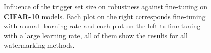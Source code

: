 \begin{figure}
    \caption{Influence of the trigger set size on robustness against fine-tuning on \textbf{CIFAR-10} models. Each plot on the right corresponds fine-tuning with a small learning rate and each plot on the left to fine-tuning with a large learning rate, all of them show the results for all watermarking methods.}
    \label{fig:finetuning-cifar10models-perarch}
\end{figure}
